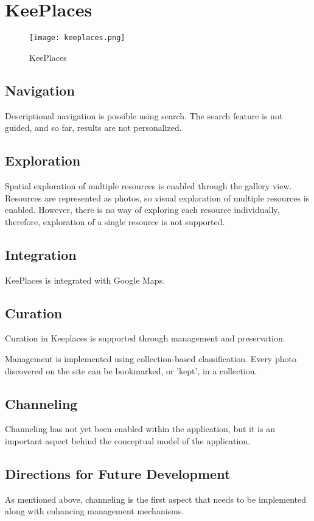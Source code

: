 {\section{KeePlaces}
\begin{figure}[ht!]
	\noindent
	\centering
	\texttt{[image: keeplaces.png]}
	\caption{KeePlaces}
	\label{fig:keeplaces} 
\end{figure}
{\subsection{Navigation}
Descriptional navigation is possible using search. The search feature is not guided, and so far, results are not personalized. 

}
{\subsection{Exploration}
Spatial exploration of multiple resources is enabled through the gallery view. 
Resources are represented as photos, so visual exploration of multiple resources is enabled. However, there is no way of exploring each resource individually, therefore, exploration of a single resource is not supported. 
}
{\subsection{Integration}
KeePlaces is integrated with Google Maps.
}
{\subsection{Curation}
Curation in Keeplaces is supported through management and preservation.

Management is implemented using collection-based classification.
Every photo discovered on the site can be bookmarked, or 'kept', in a collection.
}
{\subsection{Channeling}
Channeling has not yet been enabled within the application, but it is an important aspect behind the conceptual model of the application.
}
{\subsection{Directions for Future Development}
As mentioned above, channeling is the first aspect that needs to be implemented along with enhancing management mechanisms.
}
} %




